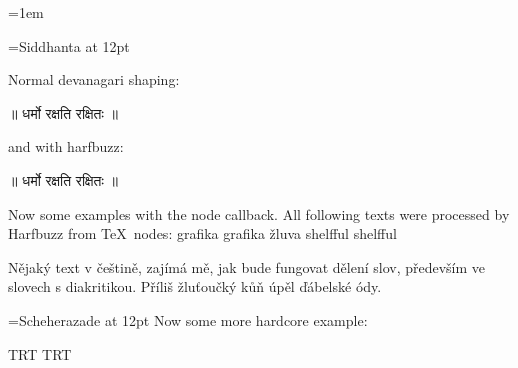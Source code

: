 \documentclass{article}
\begin{document}
\parindent=0pt
\parskip=1em
%  

\frenchspacing %

\font\siddhanta={Siddhanta} at 12pt
\bigskip

\siddhanta 

Normal devanagari shaping: 

॥ धर्मो रक्षति रक्षितः ॥

\startharfbuzz

and with harfbuzz: 


॥ धर्मो रक्षति रक्षितः ॥

\ahoj


Now some examples with the node callback. All following texts were processed by
Harfbuzz from TeX\ nodes: grafika graf\/ika žluva shelfful shelf\/ful


Nějaký text v češtině, zajímá mě, jak bude fungovat dělení slov, především ve
slovech s diakritikou. Příliš žluťoučký kůň úpěl ďábelské ódy. 


\font\amiri={Scheherazade} at 12pt
\amiri
Now some more hardcore example:

\bgroup
\luatextextdir TRT
\luatexpardir TRT
\end{document}
